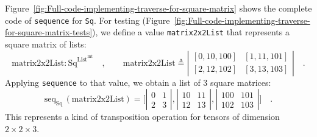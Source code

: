 Figure~\ref{fig:Full-code-implementing-traverse-for-square-matrix}
shows the complete code of \lstinline!sequence! for \lstinline!Sq!.
For testing (Figure~\ref{fig:Full-code-implementing-traverse-for-square-matrix-tests}),
we define a value \lstinline!matrix2x2List! that represents a square
matrix of lists:
\[
\text{matrix2x2List}:\text{Sq}^{\text{List}^{\text{Int}}}\quad,\quad\quad\text{matrix2x2List}\triangleq\left|\begin{array}{cc}
\left[0,10,100\right] & \left[1,11,101\right]\\
\left[2,12,102\right] & \left[3,13,103\right]
\end{array}\right|\quad.
\]
 Applying \lstinline!sequence! to that value, we obtain a list of
$3$ square matrices:
\[
\text{seq}_{\text{Sq}}\,(\text{matrix2x2List})=\big[\left|\begin{array}{cc}
0 & 1\\
2 & 3
\end{array}\right|,\left|\begin{array}{cc}
10 & 11\\
12 & 13
\end{array}\right|,\left|\begin{array}{cc}
100 & 101\\
102 & 103
\end{array}\right|\big]\quad.
\]
This represents a kind of transposition operation for tensors of dimension
$2\times2\times3$.

